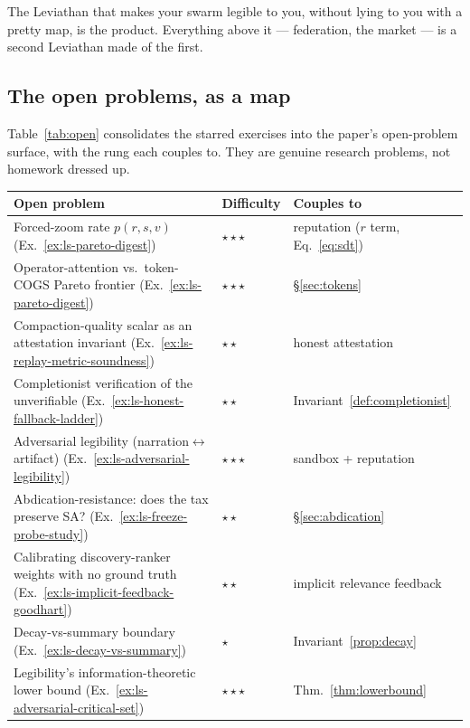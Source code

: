 \documentclass[11pt,a4paper]{article}
\theoremstyle{definition}
\theoremstyle{plain}
\begin{document}
The Leviathan that makes your swarm legible to you, without lying to you with a pretty
map, is the product. Everything above it --- federation, the market --- is a second
Leviathan made of the first.

\subsection{The open problems, as a map}\label{sec:openproblems}

Table~\ref{tab:open} consolidates the starred exercises into the paper's open-problem
surface, with the rung each couples to. They are genuine research problems, not
homework dressed up.

\begin{table}[H]
\centering
\small
\renewcommand{\arraystretch}{1.2}
\begin{tabular}{@{}p{}p{}p{}@{}}
\toprule
\textbf{Open problem} & \textbf{Difficulty} & \textbf{Couples to} \\
\midrule
Forced-zoom rate $p(r,s,v)$ (Ex.~\ref{ex:ls-pareto-digest}) & $\star\star\star$ & reputation ($r$ term, Eq.~\ref{eq:sdt}) \\
Operator-attention vs.\ token-COGS Pareto frontier (Ex.~\ref{ex:ls-pareto-digest}) & $\star\star\star$ & \S\ref{sec:tokens} \\
Compaction-quality scalar as an attestation invariant (Ex.~\ref{ex:ls-replay-metric-soundness}) & $\star\star$ & honest attestation \\
Completionist verification of the unverifiable (Ex.~\ref{ex:ls-honest-fallback-ladder}) & $\star\star$ & Invariant~\ref{def:completionist} \\
Adversarial legibility (narration$\leftrightarrow$artifact) (Ex.~\ref{ex:ls-adversarial-legibility}) & $\star\star\star$ & sandbox + reputation \\
Abdication-resistance: does the tax preserve SA? (Ex.~\ref{ex:ls-freeze-probe-study}) & $\star\star$ & \S\ref{sec:abdication} \\
Calibrating discovery-ranker weights with no ground truth (Ex.~\ref{ex:ls-implicit-feedback-goodhart}) & $\star\star$ & implicit relevance feedback \\
Decay-vs-summary boundary (Ex.~\ref{ex:ls-decay-vs-summary}) & $\star$ & Invariant~\ref{prop:decay} \\
Legibility's information-theoretic lower bound (Ex.~\ref{ex:ls-adversarial-critical-set}) & $\star\star\star$ & Thm.~\ref{thm:lowerbound} \\

\end{tabular}
\end{table}
\end{document}
